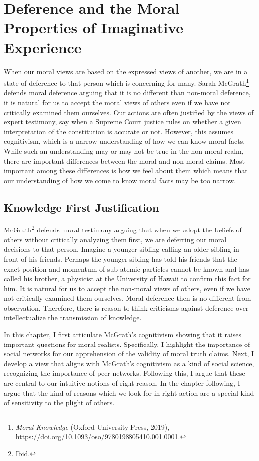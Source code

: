 \documentclass[phdthesis,12pt,final,a4paper]{wuthesis}
\theoremstyle{definition}
\theoremstyle{definition}
\theoremstyle{definition}
\theoremstyle{definition}
\theoremstyle{remark}
\begin{document}
\chapter{Deference and the Moral Properties of Imaginative Experience}\label{deference-and-the-moral-properties-of-imaginative-experience}

When our moral views are based on the expressed views of another, we are in a state of deference to that person which is concerning for many. Sarah McGrath\footnote{\emph{Moral {Knowledge}} (Oxford University Press, 2019), \url{https://doi.org/10.1093/oso/9780198805410.001.0001}.} defends moral deference arguing that it is no different than non-moral deference, it is natural for us to accept the moral views of others even if we have not critically examined them ourselves. Our actions are often justified by the views of expert testimony, say when a Supreme Court justice rules on whether a given interpretation of the constitution is accurate or not. However, this assumes cognitivism, which is a narrow understanding of how we can know moral facts. While such an understanding may or may not be true in the non-moral realm, there are important differences between the moral and non-moral claims. Most important among these differences is how we feel about them which means that our understanding of how we come to know moral facts may be too narrow.

\section{Knowledge First Justification}\label{knowledge-first-justification}

McGrath\footnote{Ibid.} defends moral testimony arguing that when we adopt the beliefs of others without critically analyzing them first, we are deferring our moral decisions to that person. Imagine a younger sibling calling an older sibling in front of his friends. Perhaps the younger sibling has told his friends that the exact position and momentum of sub-atomic particles cannot be known and has called his brother, a physicist at the University of Hawaii to confirm this fact for him. It is natural for us to accept the non-moral views of others, even if we have not critically examined them ourselves. Moral deference then is no different from observation. Therefore, there is reason to think criticisms against deference over intellectualize the transmission of knowledge.

In this chapter, I first articulate McGrath's cognitivism showing that it raises important questions for moral realists. Specifically, I highlight the importance of social networks for our apprehension of the validity of moral truth claims. Next, I develop a view that aligns with McGrath's cognitivism as a kind of social science, recognizing the importance of peer networks. Following this, I argue that these are central to our intuitive notions of right reason. In the chapter following, I argue that the kind of reasons which we look for in right action are a special kind of sensitivity to the plight of others.
\end{document}
